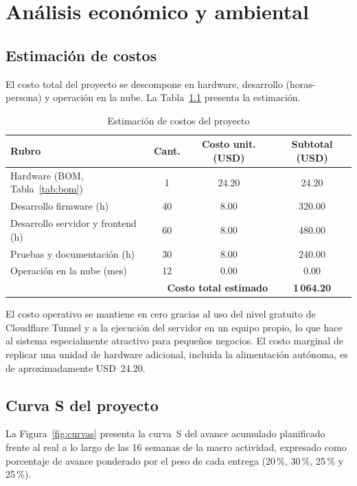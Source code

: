 \chapter{Análisis económico y ambiental}
\label{cap:economico}

\section{Estimación de costos}
El costo total del proyecto se descompone en hardware, desarrollo (horas\nobreakdash-persona) y operación en la nube. La Tabla~\ref{tab:costos} presenta la estimación.

\begin{table}[H]
\centering
\caption{Estimación de costos del proyecto}
\label{tab:costos}
\footnotesize
\begin{tabularx}{\linewidth}{@{}X c c c@{}}
\toprule
\textbf{Rubro} & \textbf{Cant.} & \textbf{Costo unit. (USD)} & \textbf{Subtotal (USD)} \\
\midrule
Hardware (BOM, Tabla~\ref{tab:bom}) & 1 & 24.20 & 24.20 \\
Desarrollo firmware (h) & 40 & 8.00 & 320.00 \\
Desarrollo servidor y frontend (h) & 60 & 8.00 & 480.00 \\
Pruebas y documentación (h) & 30 & 8.00 & 240.00 \\
Operación en la nube (mes) & 12 & 0.00 & 0.00 \\
\midrule
\multicolumn{3}{r}{\textbf{Costo total estimado}} & \textbf{1\,064.20} \\
\bottomrule
\end{tabularx}
\end{table}

El costo operativo se mantiene en cero gracias al uso del nivel gratuito de Cloudflare Tunnel y a la ejecución del servidor en un equipo propio, lo que hace al sistema especialmente atractivo para pequeños negocios. El costo marginal de replicar una unidad de hardware adicional, incluida la alimentación autónoma, es de aproximadamente USD~24.20.

\section{Curva S del proyecto}
La Figura~\ref{fig:curvas} presenta la curva~S del avance acumulado planificado frente al real a lo largo de las 16 semanas de la macro actividad, expresado como porcentaje de avance ponderado por el peso de cada entrega (20\,\%, 30\,\%, 25\,\% y 25\,\%).

